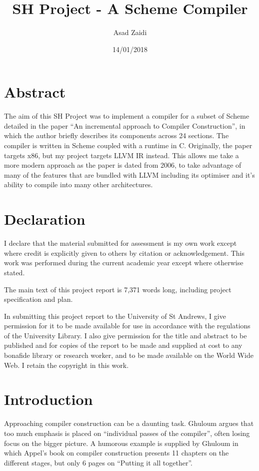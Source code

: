 \documentclass{article}
\title{SH Project - A Scheme Compiler}
\date{14/01/2018}
\author{Asad Zaidi}
\affil{University of St Andrews}
\begin{document}
\maketitle

\section{Abstract}

The aim of this SH Project was to implement a compiler for a subset of Scheme detailed in the paper ``An incremental approach to Compiler Construction'', in which the author briefly describes its components across 24 sections. The compiler is written in Scheme coupled with a runtime in C. Originally, the paper targets x86, but my project targets LLVM IR instead. This allows me take a more modern approach as the paper is dated from 2006, to take advantage of many of the features that are bundled with LLVM including its optimiser and it's ability to compile into many other architectures.

\section{Declaration}

I declare that the material submitted for assessment is my own work except where credit is explicitly given to others by citation or acknowledgement. This work was performed during the current academic year except where otherwise stated.

The main text of this project report is 7,371 words long, including project specification and plan.

In submitting this project report to the University of St Andrews, I give permission for it to be made available for use in accordance with the regulations of the University Library. I also give permission for the title and abstract to be published and for copies of the report to be made and supplied at cost to any bonafide library or research worker, and to be made available on the World Wide Web. I retain the copyright in this work.

\section{Introduction}

Approaching compiler construction can be a daunting task. Ghuloum argues that too much emphasis is placed on ``individual passes of the compiler'', often losing focus on the bigger picture. A humorous example is supplied by Ghuloum in which Appel's book on compiler construction presents 11 chapters on the different stages, but only 6 pages on ``Putting it all together''.
\end{document}
